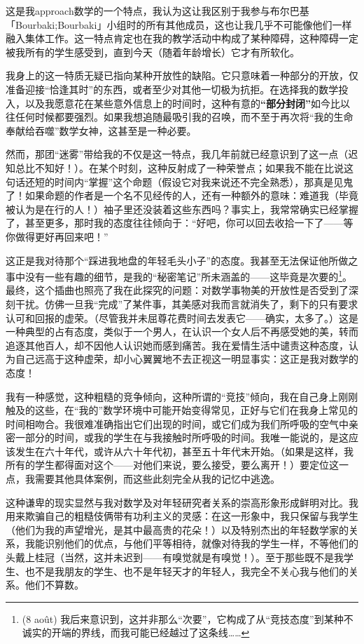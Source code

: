 这是我approach数学的一个特点，我认为这让我区别于我参与布尔巴基「Bourbaki;Bourbaki」小组时的所有其他成员，这也让我几乎不可能像他们一样融入集体工作。这一特点肯定也在我的教学活动中构成了某种障碍，这种障碍一定被我所有的学生感受到，直到今天（随着年龄增长）它才有所软化。

我身上的这一特质无疑已指向某种开放性的缺陷。它只意味着一种部分的开放，仅准备迎接``恰逢其时''的东西，或者至少对其他一切极为抗拒。在选择我的数学投入，以及我愿意花在某些意外信息上的时间时，这种有意的\textbf{``部分封闭''}如今比以往任何时候都要强烈。如果我想追随最吸引我的召唤，而不至于再次将``我的生命奉献给吞噬''数学女神，这甚至是一种必要。

然而，那团``迷雾''带给我的不仅是这一特点，我几年前就已经意识到了这一点（迟知总比不知好！）。在某个时刻，这种反射成了一种荣誉点；如果我不能在比说这句话还短的时间内``掌握''这个命题（假设它对我来说还不完全熟悉），那真是见鬼了！如果命题的作者是一个名不见经传的人，还有一种额外的意味：难道我（毕竟被认为是在行的人！）袖子里还没装着这些东西吗？事实上，我常常确实已经掌握了，甚至更多，那时我的态度往往倾向于：“好吧，你可以回去收拾一下了——等你做得更好再回来吧！”

这正是我对待那个``踩进我地盘的年轻毛头小子''的态度。我甚至无法保证他所做之事中没有一些有趣的细节，是我的``秘密笔记''所未涵盖的——这毕竟是次要的\footnote{(8 août) 我后来意识到，这并非那么``次要''，它构成了从``竞技态度''到某种不诚实的开端的界线，而我可能已经越过了这条线……}。最终，这个插曲也照亮了我在此探究的问题：对数学事物美的开放性是否受到了深刻干扰。仿佛一旦我``完成''了某件事，其美感对我而言就消失了，剩下的只有要求认可和回报的虚荣。（尽管我并未屈尊花费时间去发表它——确实，太多了。）这是一种典型的占有态度，类似于一个男人，在认识一个女人后不再感受她的美，转而追逐其他百人，却不因他人认识她而感到痛苦。我在爱情生活中谴责这种态度，认为自己远高于这种虚荣，却小心翼翼地不去正视这一明显事实：这正是我对数学的态度！

我有一种感觉，这种粗糙的竞争倾向，这种所谓的``竞技''倾向，我在自己身上刚刚触及的这些，在“我的”数学环境中可能开始变得常见，正好与它们在我身上常见的时间相吻合。我很难准确指出它们出现的时间，或它们成为我们所呼吸的空气中亲密一部分的时间，或我的学生在与我接触时所呼吸的时间。我唯一能说的，是这应该发生在六十年代，或许从六十年代初，甚至五十年代末开始。（如果是这样，我所有的学生都得面对这个——对他们来说，要么接受，要么离开！）要定位这一点，我需要其他具体案例，而这些此刻完全从我的记忆中逃逸。

这种谦卑的现实显然与我对数学及对年轻研究者关系的崇高形象形成鲜明对比。我用来欺骗自己的粗糙伎俩带有功利主义的灵感：在这一形象中，我只保留与我学生（他们为我的声望增光，是其中最高贵的花朵！）以及特别杰出的年轻数学家的关系，我能识别他们的优点，与他们平等相待，就像对待我的学生一样，不等他们的头戴上桂冠（当然，这并未迟到——有嗅觉就是有嗅觉！）。至于那些既不是我学生、也不是我朋友的学生、也不是年轻天才的年轻人，我完全不关心我与他们的关系。他们不算数。

